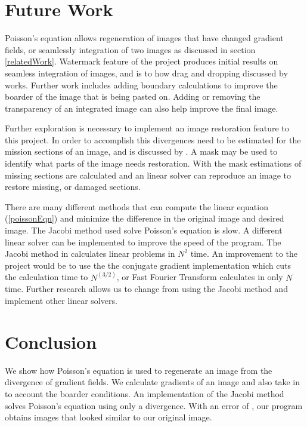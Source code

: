 \documentclass[10pt,twopage]{acmsiggraph}
\begin{document}
\section{Future Work}

Poisson's equation allows regeneration of images that have changed gradient fields, or seamlessly integration of two images as discussed in section \ref{relatedWork}. Watermark feature of the project produces initial results on seamless integration of images, and is to how drag and dropping discussed by \cite{ddp} works. Further work includes adding boundary calculations to improve the boarder of the image that is being pasted on. Adding or removing the transparency of an integrated image can also help improve the final image. 

Further exploration is necessary to implement an image restoration feature to this project. In order to accomplish this divergences need to be estimated for the mission sections of an image, and is discussed by \cite{Perez}. A mask may be used to identify what parts of the image needs restoration. With the mask estimations of missing sections are calculated and an linear solver can reproduce an image to restore missing, or damaged sections. 

There are many different methods that can compute the linear equation (\ref{poissonEqn}) and minimize the difference in the original image and desired image. The Jacobi method used solve Poisson's equation is slow. A different linear solver can be implemented to improve the speed of the program. The Jacobi method in calculates linear problems in $N^2$ time. An improvement to the project would be to use the the conjugate gradient implementation which cuts the calculation time to $N^(3/2)$, or Fast Fourier Transform calculates in only $N$ time. Further research allows us to change from using the Jacobi method and implement other linear solvers.

\section{Conclusion}

We show how Poisson's equation is used to regenerate an image from the divergence of gradient fields. We calculate gradients of an image and also take in to account the boarder conditions. An implementation of the Jacobi method solves Poisson's equation using only a divergence. With an error of \result, our program obtains images that looked similar to our original image.
\end{document}
